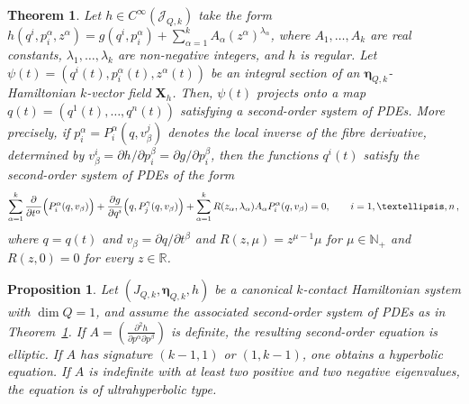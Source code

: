 \documentclass[10pt,a4paper]{amsart}
\newtheorem{theorem}{Theorem}
\newtheorem{proposition}{Proposition}
\begin{document}
\begin{theorem}\label{thm:linear_z_same_second_order_system}
Let \(h\in C^\infty(\mathcal J_{Q,k})\) take the form \(h(q^i,p_i^\alpha,z^\alpha)=g(q^i,p_i^\alpha)+\sum_{\alpha=1}^kA_\alpha (z^\alpha)^{\lambda_\alpha}\), where \(A_1,\dots,A_k\) are real constants, $\lambda_1,\ldots,\lambda_k$ are non-negative integers, and \(h\) is regular. Let  \(\psi(t)=(q^i(t),p_i^\alpha(t),z^\alpha(t))\) be an integral section of an \(\bm\eta_{Q,k}\)-Hamiltonian \(k\)-vector field \({\bm X}_{h}\). Then, \(\psi(t)\) projects onto a map \(q(t)=(q^1(t),\dots,q^n(t))\) satisfying a second-order system of PDEs. More precisely, if \(p_i^\alpha=P_i^\alpha(q ,v_\beta^j)\) denotes the local inverse of the fibre derivative, determined by \(v_\beta^i=\partial h/\partial p_i^\beta=\partial g/\partial p_i^\beta\), then the functions \(q^i(t)\) satisfy the second-order system of PDEs of the form
\begin{equation}\label{eq:second_order_system_linear_z}
\sum_{\alpha=1}^k \frac{\partial}{\partial t^\alpha}\Bigl(P_i^\alpha(q,v_\beta)\Bigr)
+\frac{\partial g}{\partial q^i}\Bigl(q,P_j^\gamma(q,v_\beta)\Bigr)
+\sum_{\alpha=1}^k R(z_\alpha,\lambda_\alpha) A_\alpha P_i^\alpha(q,v_\beta)=0,\qquad i=1,\ldots,n\,,
\end{equation}
where \(q=q(t)\) and \(v_\beta =\partial q /\partial t^\beta\) and $R(z ,\mu)=z ^{\mu-1}\mu$  for $\mu\in \mathbb{N}_+$ and $R(z ,0)=0$ for every $z\in \mathbb{R}$.
\end{theorem}

\begin{proposition}\label{prop:regularity_not_hyperbolicity}
Let \((J_{Q,k},\bm\eta_{Q,k},h)\) be a canonical \(k\)-contact Hamiltonian system with $\dim Q=1$, and assume  the associated  second-order system of PDEs as in Theorem~\ref{thm:linear_z_same_second_order_system}.   
If $A=\left(\frac{\partial^2 h}{\partial p^\alpha\partial p^\beta}\right)$ is definite, the resulting second-order equation is elliptic. If $A$ has signature $(k-1,1)$ or $(1,k-1)$, one obtains a hyperbolic equation. If $A$ is indefinite with at least two positive and two negative eigenvalues, the equation is of ultrahyperbolic type.  

\end{proposition} 
\end{document}
